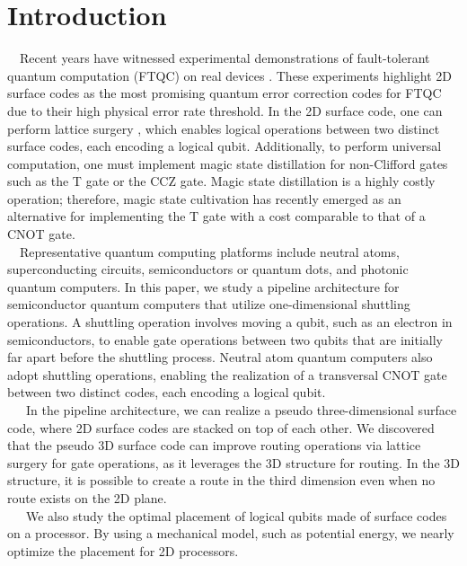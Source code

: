 \documentclass[a4paper,11pt]{ltjsarticle}
\begin{document}
\section{Introduction}
\ \ Recent years have witnessed experimental demonstrations of fault-tolerant quantum computation (FTQC) on real devices \cite{bluvstein2024}\cite{google2024}. These experiments highlight 2D surface codes as the most promising quantum error correction codes for FTQC due to their high physical error rate threshold. In the 2D surface code, one can perform lattice surgery \cite{horsman2012}, which enables logical operations between two distinct surface codes, each encoding a logical qubit. Additionally, to perform universal computation, one must implement magic state distillation \cite{litinski2019-2} for non-Clifford gates such as the T gate or the CCZ gate. Magic state distillation is a highly costly operation; therefore, magic state cultivation \cite{gidney2024} has recently emerged as an alternative for implementing the T gate with a cost comparable to that of a CNOT gate.\\
\ \ Representative quantum computing platforms include neutral atoms, superconducting circuits, semiconductors or quantum dots, and photonic quantum computers. In this paper, we study a pipeline architecture \cite{cai2023} for semiconductor quantum computers that utilize one-dimensional shuttling operations. A shuttling operation involves moving a qubit, such as an electron in semiconductors, to enable gate operations between two qubits that are initially far apart before the shuttling process. Neutral atom quantum computers also adopt shuttling operations, enabling the realization of a transversal CNOT gate between two distinct codes, each encoding a logical qubit.\\
\ \ \ In the pipeline architecture, we can realize a pseudo three-dimensional surface code, where 2D surface codes are stacked on top of each other. We discovered that the pseudo 3D surface code can improve routing operations via lattice surgery for gate operations, as it leverages the 3D structure for routing. In the 3D structure, it is possible to create a route in the third dimension even when no route exists on the 2D plane.\\
\ \ \ We also study the optimal placement of logical qubits made of surface codes on a processor. By using a mechanical model, such as potential energy, we nearly optimize the placement for 2D processors.\\
\end{document}
